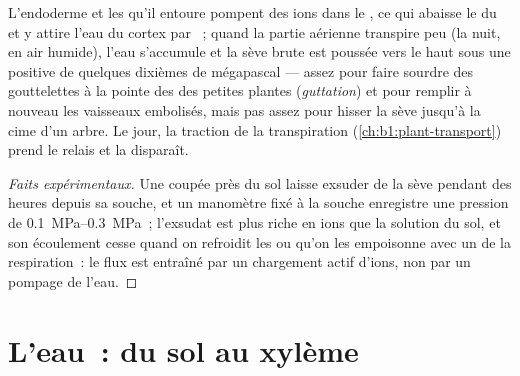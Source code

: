 \begin{proposition}\label{prop:b1:plant-water-minerals:rootpressure}
L'endoderme et les  qu'il entoure pompent des ions dans le
, ce qui abaisse le  du  et y attire
l'eau du cortex par ~; quand la partie aérienne transpire peu (la
nuit, en air humide), l'eau s'accumule et la sève brute est poussée
vers le haut sous une \emph{} positive de quelques
dixièmes de mégapascal --- assez pour faire sourdre des gouttelettes à
la pointe des  des petites plantes (\emph{guttation}) et pour
remplir à nouveau les vaisseaux embolisés, mais pas assez pour hisser
la sève jusqu'à la cime d'un arbre. Le jour, la traction de la
transpiration (\cref{ch:b1:plant-transport}) prend le relais et la
 disparaît.
\end{proposition}
\begin{proof}[Faits expérimentaux]
Une  coupée près du sol laisse exsuder de la sève pendant des
heures depuis sa souche, et un manomètre fixé à la souche enregistre
une pression de \qtyrange{0.1}{0.3}{MPa}~; l'exsudat est plus riche en
ions que la solution du sol, et son écoulement cesse quand on
refroidit les  ou qu'on les empoisonne avec un  de la
respiration~: le flux est entraîné par un chargement actif d'ions, non
par un pompage de l'eau.
\end{proof}

\section{L'eau~: du sol au xylème}

